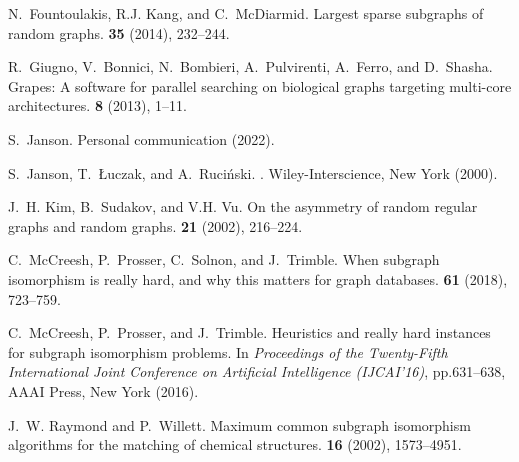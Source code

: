 \documentclass{article}
\begin{document}
\begin{thebibliography}{10}
N.~Fountoulakis, R.J. Kang, and C.~McDiarmid.
\newblock Largest sparse subgraphs of random graphs.
 {\bf 35} (2014), 232--244.

R.~Giugno, V.~Bonnici, N.~Bombieri, A.~Pulvirenti, A.~Ferro, and D.~Shasha.
\newblock Grapes: A software for parallel searching on biological graphs targeting multi-core architectures.
 {\bf 8} (2013), 1--11.

S.~Janson.
\newblock Personal communication (2022).

S.~Janson, T.~{\L}uczak, and A.~Ruci{\'n}ski.
.
\newblock Wiley-Interscience, New York (2000).

J.~H. Kim, B.~Sudakov, and V.H. Vu.
\newblock On the asymmetry of random regular graphs and random graphs.
 {\bf 21} (2002), 216--224.

C.~McCreesh, P.~Prosser, C.~Solnon, and J.~Trimble.
\newblock When subgraph isomorphism is really hard, and why this matters for graph databases.
 {\bf 61} (2018), 723--759.


C.~McCreesh, P.~Prosser, and J.~Trimble.
\newblock Heuristics and really hard instances for subgraph isomorphism problems.
\newblock In {\em Proceedings of the Twenty-Fifth International Joint  Conference on Artificial Intelligence (IJCAI'16)}, pp.631--638, AAAI Press, New York (2016). 

J.~W. Raymond and P.~Willett.
\newblock Maximum common subgraph isomorphism algorithms for the matching of chemical structures.
 {\bf 16} (2002), 1573--4951.

\end{thebibliography}
\normalsize





\appendix
\end{document}
